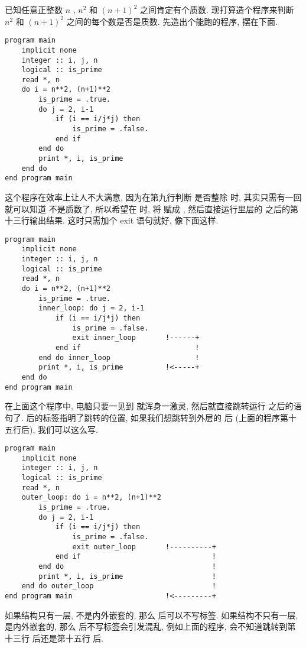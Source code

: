 已知任意正整数 $n$ , $n^2$ 和 $(n+1)^2$ 之间肯定有个质数. 现打算造个程序来判断 $n^2$ 和 $(n+1)^2$ 之间的每个数是否是质数. 先造出个能跑的程序, 摆在下面.
\begin{lstlisting}
program main
    implicit none
    integer :: i, j, n
    logical :: is_prime
    read *, n
    do i = n**2, (n+1)**2
        is_prime = .true.
        do j = 2, i-1
            if (i == i/j*j) then
                is_prime = .false.
            end if
        end do
        print *, i, is_prime
    end do
end program main
\end{lstlisting}
这个程序在效率上让人不大满意, 因为在第九行判断  是否整除  时, 其实只需有一回  就可以知道  不是质数了, 所以希望在  时, 将  赋成 , 然后直接运行里层的  之后的第十三行输出结果. 这时只需加个 exit 语句就好, 像下面这样.
\begin{lstlisting}
program main
    implicit none
    integer :: i, j, n
    logical :: is_prime
    read *, n
    do i = n**2, (n+1)**2
        is_prime = .true.
        inner_loop: do j = 2, i-1
            if (i == i/j*j) then
                is_prime = .false.
                exit inner_loop       !------+
            end if                           !
        end do inner_loop                    !
        print *, i, is_prime          !<-----+
    end do
end program main
\end{lstlisting}
在上面这个程序中, 电脑只要一见到  就浑身一激灵, 然后就直接跳转运行  之后的语句了.  后的标签指明了跳转的位置, 如果我们想跳转到外层的  后 (上面的程序第十五行后), 我们可以这么写.
\begin{lstlisting}
program main
    implicit none
    integer :: i, j, n
    logical :: is_prime
    read *, n
    outer_loop: do i = n**2, (n+1)**2
        is_prime = .true.
        do j = 2, i-1
            if (i == i/j*j) then
                is_prime = .false.
                exit outer_loop       !----------+
            end if                               !
        end do                                   !
        print *, i, is_prime                     !
    end do outer_loop                            !
end program main                      !<---------+
\end{lstlisting}

如果结构只有一层, 不是内外嵌套的, 那么  后可以不写标签. 如果结构不只有一层, 是内外嵌套的, 那么  后不写标签会引发混乱, 例如上面的程序, 会不知道跳转到第十三行  后还是第十五行  后.

